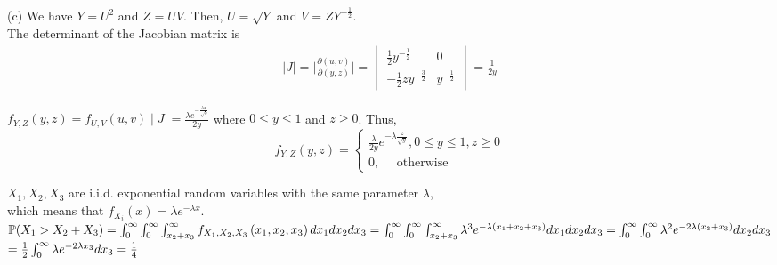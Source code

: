 \documentclass{homework}
\begin{document}
(c) We have $Y=U^2$ and $Z=UV$. Then, $U=\sqrt{Y}$ and $V=ZY^{-\frac{1}{2}}$.\\
The determinant of the Jacobian matrix is 
\begin{equation}
    \begin{aligned}
        \mid J \mid = \mid \frac{\partial(u,v)}{\partial(y,z)} \mid = 	
        \begin{vmatrix} 

            \frac{1}{2}y^{-\frac{1}{2}} & 0 \\
     
            -\frac{1}{2}zy^{-\frac{3}{2}} & y^{-\frac{1}{2}}
     
            \end{vmatrix}	= \frac{1}{2y}
    \end{aligned}
\end{equation}
 
$f_{Y,Z}(y,z)=f_{U,V}(u,v)\mid J \mid = \frac{\lambda e^{-\frac{\lambda z}{\sqrt{g}}}}{2 y}$ where $0\leq y\leq 1$ and $z \geq 0$.
Thus,
\begin{equation}
    f_{Y, Z}(y, z)=\left\{\begin{array}{l}
        \frac{\lambda}{2 y} e^{-\lambda \frac{z}{\sqrt{y}}},  0\leq y\leq 1, z \geq 0\\
        0, \quad \text { otherwise }
        \end{array}\right.
\end{equation}

\question %
$X_{1}, X_{2}, X_{3}$ are i.i.d. exponential random variables with the same parameter $\lambda$,\\
which means that $f_{X_{i}}(x) = \lambda e^{-\lambda x}$.\\
$\mathbb{P}(X_{1}>X_{2}+X_{3})\\
=\int_{0}^{\infty} \int_{0}^{\infty} \int_{x_{2}+x_{3}}^{\infty} f_{X_{1},X_{2},X_{3}}\left(x_{1}, x_{2}, x_{3}\right) d x_{1} d x_{2} d x_{3} \\
=\int_{0}^{\infty} \int_{0}^{\infty} \int_{x_{2}+x_{3}}^{\infty} \lambda^{3} e^{-\lambda\left(x_{1}+x_{2}+x_{3}\right)} d x_{1} d x_{2} d x_{3} \\
=\int_{0}^{\infty} \int_{0}^{\infty} \lambda^{2} e^{-2 \lambda\left(x_{2}+x_{3}\right)} d x_{2} d x_{3}$\\
$=\frac{1}{2} \int_{0}^{\infty} \lambda e^{-2 \lambda x_{3}} d x_{3}\\
=\frac{1}{4}$
\end{document}

